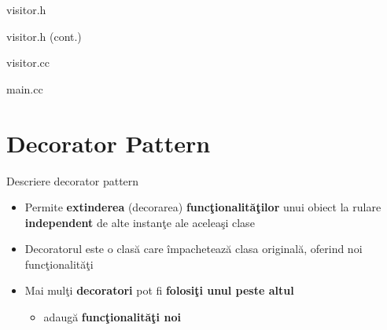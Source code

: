 \documentclass{beamer}
\begin{document}
\begin{frame}{visitor.h}
	\footnotesize{}
\end{frame}

\begin{frame}{visitor.h (cont.)}
	\footnotesize{}
\end{frame}

\begin{frame}{visitor.cc}
	\footnotesize{}
\end{frame}

\begin{frame}{main.cc}
	\footnotesize{}
\end{frame}


\section{Decorator Pattern}

\begin{frame}{Descriere decorator pattern}
	\begin{itemize}
		\item Permite \textbf{extinderea} (decorarea) \textbf{funcţionalităţilor} unui obiect la rulare \textbf{independent} de alte instanţe ale aceleaşi clase
		\vspace{4mm}
		\item Decoratorul este o clasă care împachetează clasa originală, oferind noi funcţionalităţi
		\vspace{4mm}
		\item Mai mulţi \textbf{decoratori} pot fi \textbf{folosiţi unul peste altul}
			\begin{itemize}
				\item adaugă \textbf{funcţionalităţi noi}
			\end{itemize}
	\end{itemize}
\end{frame}
\end{document}
